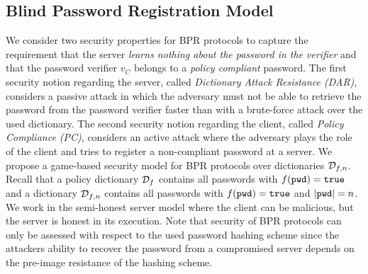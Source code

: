 \subsection{Blind Password Registration Model} \label{sec:bpr-model}
We consider two security properties for \ac{BPR} protocols to capture the requirement that the server \emph{learns nothing about the password in the verifier} and that the password verifier $v_C$ belongs to a \emph{policy compliant} password.
The first security notion regarding the server, called \emph{Dictionary Attack Resistance (DAR)}, considers a passive attack in which the adversary must not be able to retrieve the password from the password verifier faster than with a brute-force attack over the used dictionary.
The second security notion regarding the client, called \emph{Policy Compliance (PC)}, considers an active attack where the adversary plays the role of the client and tries to register a non-compliant password at a server.
We propose a game-based security model for \ac{BPR} protocols over dictionaries $\mathcal{D}_{f,n}$.
Recall that a policy dictionary $\mathcal{D}_f$ contains all passwords \pwd with $f(\mathtt{pwd})=\mathtt{true}$ and a dictionary $\mathcal{D}_{f,n}$ contains all passwords \pwd with $f(\mathtt{pwd})=\mathtt{true}$ and $|\mathtt{pwd}|=n$.
We work in the semi-honest server model where the client can be malicious, but the server is honest in its execution.
Note that security of \ac{BPR} protocols can only be assessed with respect to the used password hashing scheme \HashP since the attackers ability to recover the password from a compromised server depends on the pre-image resistance of the hashing scheme.


